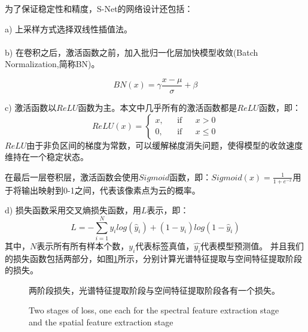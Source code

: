 \documentclass[10pt]{ctexart}
\newcommand{\upcite}[1]{\textsuperscript{\textsuperscript{\cite{#1}}}}
\begin{document}
\begin{multicols}{2}
为了保证稳定性和精度，S-Net的网络设计还包括：

a) 上采样方式选择双线性插值法。

b) 在卷积之后，激活函数之前，加入批归一化层\upcite{ioffe2015batch}加快模型收敛(Batch Normalization,简称BN)。

\begin{equation}
    {BN}(x) = \gamma\frac{x-\mu}{\sigma}+\beta
\end{equation}

c) 激活函数以$ReLU$函数为主。本文中几乎所有的激活函数都是$ReLU$函数，即：
\begin{equation}
    {ReLU}(x)=\left\{
    \begin{aligned}
        x, & &\text{if} & & x > 0 \\
        0, & &\text{if} & & x \leq 0
    \end{aligned}
    \right.
\end{equation}
$ReLU$由于非负区间的梯度为常数，可以缓解梯度消失问题，使得模型的收敛速度维持在一个稳定状态。

在最后一层卷积层，激活函数会使用$Sigmoid$函数，即：${Sigmoid}(x)=\frac{1}{1+e^{-x}}$用于将输出映射到0-1之间，代表该像素点为云的概率。

d) 损失函数采用交叉熵损失函数，用$L$表示，即：
\begin{equation}
    {L} = -\sum_{i=1}^N y_ilog(\hat{y}_i)+(1-y_i)log(1-\hat{y}_i)
\end{equation}
其中，$N$表示所有所有样本个数，$y_i$代表标签真值，$\hat{y_i}$代表模型预测值。
并且我们的损失函数包括两部分，如图\ref{pic:loss}所示，分别计算光谱特征提取与空间特征提取阶段的损失。
\begin{figure}[H]
    \centering
    \caption[]{两阶段损失，光谱特征提取阶段与空间特征提取阶段各有一个损失。}
    \addtocounter{figure}{-1}
    \vspace{-5pt}
    \renewcommand{\figurename}{Fig}
    \caption{Two stages of loss, one each for the spectral feature extraction stage and the spatial feature extraction stage}
    \renewcommand{\figurename}{图}
    \label{pic:loss}
\end{figure}


\end{multicols}
\end{document}
